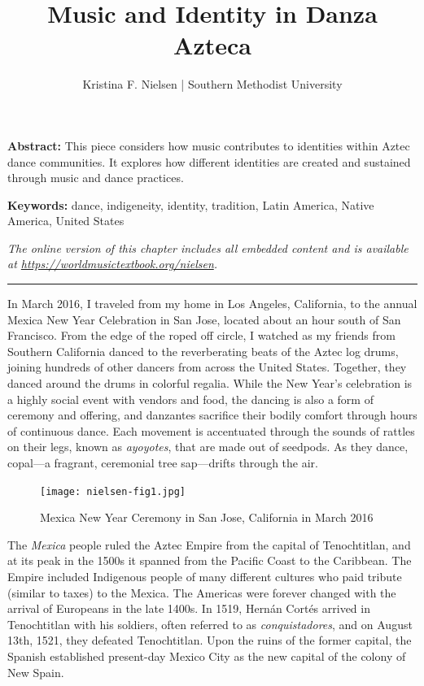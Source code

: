 \documentclass[twoside]{article}
\title{Music and Identity in Danza Azteca}
\author{Kristina F. Nielsen | Southern Methodist University}
\date{}
\makeatletter
\renewcommand{\maketitle}{\bgroup\setlength{\parindent}{0pt}
\begin{flushleft}
  \vspace*{3\baselineskip}
  \huge{\textbf{\@title}}

  \medskip
  
  \large{\@author}
\end{flushleft}\egroup
}
\providecommand{\abstracttext}[1]
{
  \noindent
  \textbf{Abstract:} #1
}
\providecommand{\keywords}[1]
{
  \newline
  \textbf{Keywords:} #1
}
\providecommand{\wmturl}{\href{https://worldmusictextbook.org/nielsen}{https://worldmusictextbook.org/nielsen}}
\providecommand{\wmturltext}{
  \noindent\emph{The online version of this chapter includes all embedded content and is available at \wmturl.}
}
\makeatother
\begin{document}
\suppressfloats %
\maketitle

\abstracttext{This piece considers how music contributes to identities within Aztec dance communities. It explores how different identities are created and sustained through music and dance practices.}
\keywords{dance, indigeneity, identity, tradition, Latin America, Native America, United States}

\smallskip

\wmturltext

\medskip

\noindent\hfil\rule{0.5\textwidth}{0.4pt}\hfil

\bigskip

In March 2016, I traveled from my home in Los Angeles, California, to
the annual Mexica New Year Celebration in San Jose, located about an
hour south of San Francisco. From the edge of the roped off circle, I
watched as my friends from Southern California danced to the
reverberating beats of the Aztec log drums, joining hundreds of other
dancers from across the United States. Together, they danced around the
drums in colorful regalia. While the New Year's celebration is a highly
social event with vendors and food, the dancing is also a form of
ceremony and offering, and danzantes sacrifice their bodily comfort
through hours of continuous dance. Each movement is accentuated through
the sounds of rattles on their legs, known as \emph{ayoyotes}, that are
made out of seedpods. As they dance, copal---a fragrant, ceremonial tree
sap---drifts through the air.

\begin{figure}
  \texttt{[image: nielsen-fig1.jpg]}
  \caption{Mexica New Year Ceremony in San Jose, California in March 2016}
\end{figure}

The \emph{Mexica} people ruled the Aztec Empire from the capital of
Tenochtitlan, and at its peak in the 1500s it spanned from the Pacific
Coast to the Caribbean. The Empire included Indigenous people of many
different cultures who paid tribute (similar to taxes) to the Mexica.
The Americas were forever changed with the arrival of Europeans in the
late 1400s. In 1519, Hernán Cortés arrived in Tenochtitlan with his
soldiers, often referred to as \emph{conquistadores}, and on August
13th, 1521, they defeated Tenochtitlan. Upon the ruins of the former
capital, the Spanish established present-day Mexico City as the new
capital of the colony of New Spain.
\end{document}
